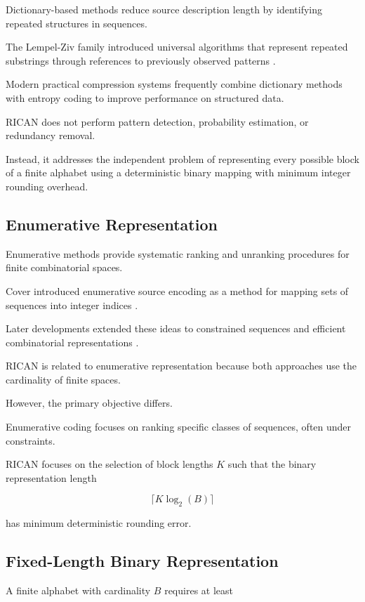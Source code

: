 \documentclass[onecolumn]{IEEEtran}
\begin{document}
Dictionary-based methods reduce source description length by identifying
repeated structures in sequences.

The Lempel-Ziv family introduced universal algorithms that represent
repeated substrings through references to previously observed patterns
\cite{ziv1977}.

Modern practical compression systems frequently combine dictionary
methods with entropy coding to improve performance on structured data.

RICAN does not perform pattern detection, probability estimation, or
redundancy removal.

Instead, it addresses the independent problem of representing every
possible block of a finite alphabet using a deterministic binary
mapping with minimum integer rounding overhead.

\subsection{Enumerative Representation}

Enumerative methods provide systematic ranking and unranking procedures
for finite combinatorial spaces.

Cover introduced enumerative source encoding as a method for mapping
sets of sequences into integer indices
\cite{cover1973}.

Later developments extended these ideas to constrained sequences and
efficient combinatorial representations
\cite{immink2004}.

RICAN is related to enumerative representation because both approaches
use the cardinality of finite spaces.

However, the primary objective differs.

Enumerative coding focuses on ranking specific classes of sequences,
often under constraints.

RICAN focuses on the selection of block lengths $K$ such that the
binary representation length

\[
\lceil K\log_2(B)\rceil
\]

has minimum deterministic rounding error.

\subsection{Fixed-Length Binary Representation}

A finite alphabet with cardinality $B$ requires at least
\end{document}
